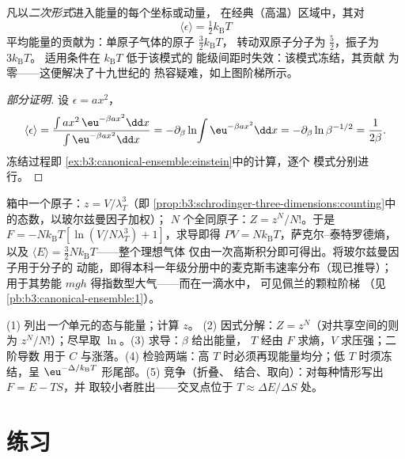 \begin{theorem}[能量均分定理及其适用条件]\label{thm:b3:canonical-ensemble:equipartition}
凡以\emph{二次形式}进入能量的每个坐标或动量，
在经典（高温）区域中，其对
\[
\langle\epsilon\rangle = \tfrac12 k_{\text{B}}T
\]
平均能量的贡献为：单原子气体的原子 $\tfrac32 k_{\text{B}}T$，
转动双原子分子为 $\tfrac52$，振子为 $3k_{\text{B}}T$。
适用条件在 $k_{\text{B}}T$ 低于该模式的
能级间距时失效：该模式冻结，其贡献
为零——这便解决了十九世纪的
热容疑难，如上图阶梯所示。
\end{theorem}

\begin{proof}[部分证明]
设 $\epsilon = ax^2$，
\[
\langle\epsilon\rangle
 = \frac{\int ax^2\,\eu^{-\beta ax^2}\dd x}
        {\int\eu^{-\beta ax^2}\dd x}
 = -\partial_\beta\ln\!\int\eu^{-\beta ax^2}\dd x
 = -\partial_\beta\ln\beta^{-1/2} = \frac{1}{2\beta} .
\] 冻结过程即
\cref{ex:b3:canonical-ensemble:einstein}中的计算，逐个
模式分别进行。
\end{proof}

\begin{example}[正则系综下的气体]\label{ex:b3:canonical-ensemble:gas}
箱中一个原子：$z = V/\lambda_T^3$（即
\cref{prop:b3:schrodinger-three-dimensions:counting}中的态数，以玻尔兹曼因子加权）；
$N$ 个全同原子：$Z = z^N/N!$。于是 $F =
-Nk_{\text{B}}T[\ln(V/N\lambda_T^3) + 1]$，求导即得
$PV = Nk_{\text{B}}T$，萨克尔–泰特罗德熵，以及
$\langle E\rangle = \tfrac32 Nk_{\text{B}}T$——整个理想气体
仅由一次高斯积分即可得出。将玻尔兹曼因子用于分子的
动能，即得本科一年级分册中的麦克斯韦速率分布（现已推导）；
用于其势能
$mgh$ 得指数型大气——而在一滴水中，
可见佩兰的颗粒阶梯
（见\cref{pb:b3:canonical-ensemble:1}）。
\end{example}

\begin{method}[正则计算技巧]\label{met:b3:canonical-ensemble:method}
(1) 列出\emph{一个}单元的态与能量；计算 $z$。
(2) 因式分解：$Z = z^N$（对共享空间的则为
$z^N/N!$）；尽早取 $\ln$。(3) 求导：$\beta$ 给出能量，
$T$ 经由 $F$ 求熵，$V$ 求压强；二阶导数
用于 $C$ 与涨落。(4) 检验两端：高 $T$
时必须再现能量均分；低 $T$ 时须冻结，呈
$\eu^{-\Delta/k_{\text{B}}T}$ 形尾部。(5) 竞争（折叠、
结合、取向）：对每种情形写出 $F = E - TS$，并
取较小者胜出——交叉点位于 $T \approx \Delta
E/\Delta S$ 处。
\end{method}

\section{练习}

